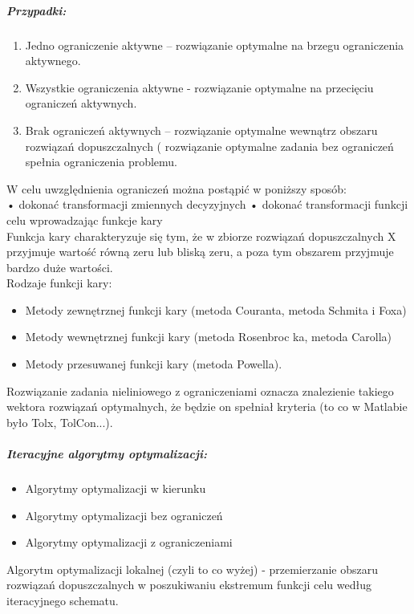 \documentclass[a4paper,twoside]{report}
\begin{document}
		\subparagraph{Przypadki:}
		
		\begin{enumerate}
			
			\item Jedno ograniczenie aktywne – rozwiązanie optymalne na brzegu ograniczenia
			aktywnego.
			\item Wszystkie ograniczenia aktywne - rozwiązanie optymalne na przecięciu ograniczeń
			aktywnych.
			\item Brak ograniczeń aktywnych – rozwiązanie optymalne wewnątrz obszaru rozwiązań
			dopuszczalnych ( rozwiązanie optymalne zadania bez ograniczeń spełnia
			ograniczenia problemu.
			
		\end{enumerate}
		
		W celu uwzględnienia ograniczeń można postąpić w poniższy sposób:\\
		• dokonać transformacji zmiennych decyzyjnych
		• dokonać transformacji funkcji celu wprowadzając funkcje kary\\
		
		Funkcja kary charakteryzuje się tym, że w zbiorze rozwiązań dopuszczalnych X przyjmuje wartość równą zeru lub bliską zeru, a poza tym obszarem przyjmuje bardzo duże wartości.\\
		
		Rodzaje funkcji kary:
		\begin{itemize}
			\item Metody zewnętrznej funkcji kary (metoda Couranta,
			metoda 
			Schmita i Foxa)
			\item Metody wewnętrznej funkcji kary (metoda Rosenbroc
			ka, 
			metoda Carolla)
			\item Metody przesuwanej funkcji kary (metoda Powella).
		\end{itemize}
		
		Rozwiązanie zadania nieliniowego z ograniczeniami oznacza znalezienie takiego wektora rozwiązań optymalnych,  że będzie on spełniał kryteria (to co w Matlabie było Tolx, TolCon...).
		
		
		\subparagraph{Iteracyjne algorytmy optymalizacji:}
		\begin{itemize}
			\item Algorytmy optymalizacji w kierunku
			\item Algorytmy optymalizacji bez ograniczeń
			\item Algorytmy optymalizacji z ograniczeniami
		\end{itemize}
		Algorytm optymalizacji lokalnej (czyli to co wyżej) - przemierzanie obszaru rozwiązań dopuszczalnych w poszukiwaniu ekstremum funkcji celu według iteracyjnego schematu.
		
\end{document}

